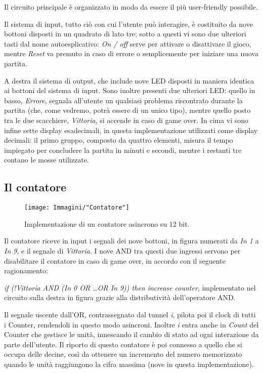 \documentclass[11pt]{article}
\begin{document}
Il circuito principale è organizzato in modo da essere il più user-friendly possibile.

Il sistema di input, tutto ciò con cui l'utente può interagire, è costituito da nove bottoni disposti in un quadrato di lato tre; sotto a questi vi sono due ulteriori tasti dal nome autoesplicativo: {\itshape On / off} serve per attivare o disattivare il gioco, mentre {\itshape Reset} va premuto in caso di errore o semplicemente per iniziare una nuova partita.

A destra il sistema di output, che include nove LED disposti in maniera identica ai bottoni del sistema di input. Sono inoltre presenti due ulteriori LED: quello in basso, {\itshape Errore}, segnala all'utente un qualsiasi problema riscontrato durante la partita (che, come vedremo, potrà essere di un unico tipo), mentre quello posto tra le due scacchiere, {\itshape Vittoria}, si accende in caso di game over. In cima vi sono infine sette display esadecimali, in questa implementazione utilizzati come display decimali: il primo gruppo, composto da quattro elementi, misura il tempo impiegato per concludere la partita in minuti e secondi, mentre i restanti tre contano le mosse utilizzate.


\subsection{Il contatore}

\begin{figure}[H]
\centering
\texttt{[image: Immagini/"Contatore"]}
\caption{{\small Implementazione di un contatore asincrono su 12 bit.}}
\label{fig:contatore}
\end{figure}

Il contatore riceve in input i segnali dei nove bottoni, in figura numerati da {\itshape In 1} a {\itshape In 9}, e il segnale di {\itshape Vittoria}. I nove AND tra questi due ingressi servono per disabilitare il contatore in caso di game over, in accordo con il seguente ragionamento:

{\itshape if (!Vittoria AND (In 0 OR \dots OR In 9)) then increase counter}, implementato nel circuito sulla destra in figura grazie alla distributività dell'operatore AND.

Il segnale uscente dall'OR, contrassegnato dal tunnel {\itshape i}, pilota poi il clock di tutti i Counter, rendendoli in questo modo asincroni. Inoltre {\itshape i} entra anche in {\itshape Count} del Counter che gestisce le unità, innescando il cambio di stato ad ogni interazione da parte dell'utente. Il riporto di questo contatore è poi connesso a quello che si occupa delle decine, così da ottenere un incremento del numero memorizzato quando le unità raggiungono la cifra massima (nove in questa implementazione).
\end{document}
